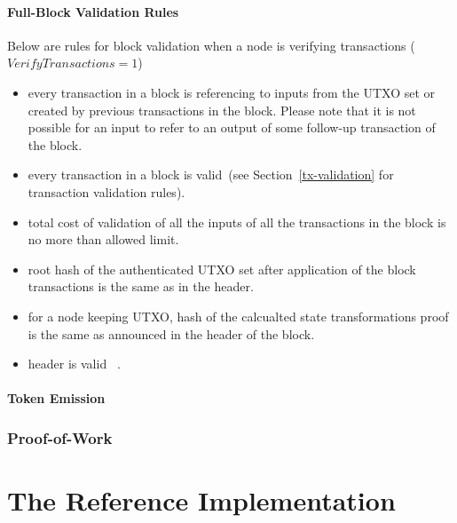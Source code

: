 \documentclass[]{article}   %
\newcommand{\authnote}[2]{\marginpar{\parbox{\marginparwidth}{\tiny %
  \textsf{#1 {\textcolor{blue}{notes: #2}}}}}%
  \textcolor{blue}{\textbf{\dag}}}
\newcommand{\authnote}[2]{
  \textsf{#1 \textcolor{blue}{: #2}}}
\newcommand{\authnote}[2]{}
\newcommand{\knote}[1]{{\authnote{\textcolor{green}{Alex notes}}{#1}}}
\begin{document}
\subsection{Full-Block Validation Rules}

Below are rules for block validation when a node is verifying transactions ($VerifyTransactions = 1$)

\begin{itemize}
    \item{} every transaction in a block is referencing to inputs from the UTXO set or created by previous transactions
    in the block. Please note that it is not possible for an input to refer to an output of some follow-up transaction
    of the block.
    \item{} every transaction in a block is valid~(see Section~\ref{tx-validation} for transaction validation rules).
    \item{} total cost of validation of all the inputs of all the transactions in the block is no more than
    allowed limit.
    \item{} root hash of the authenticated UTXO set after application of the block transactions is the same as
    in the header.
    \item{} for a node keeping UTXO, hash of the calcualted state transformations proof is the same as announced
    in the header of the block.
    \item{} header is valid~\knote{link to header validation rules}.
\end{itemize}

\knote{mention emission rules. extractEmissionBox is buggy probably.}
\knote{extension validation rules}

\subsection{Token Emission}





\section{Proof-of-Work}

\part{The Reference Implementation}
\label{part-impl}


\end{document}
